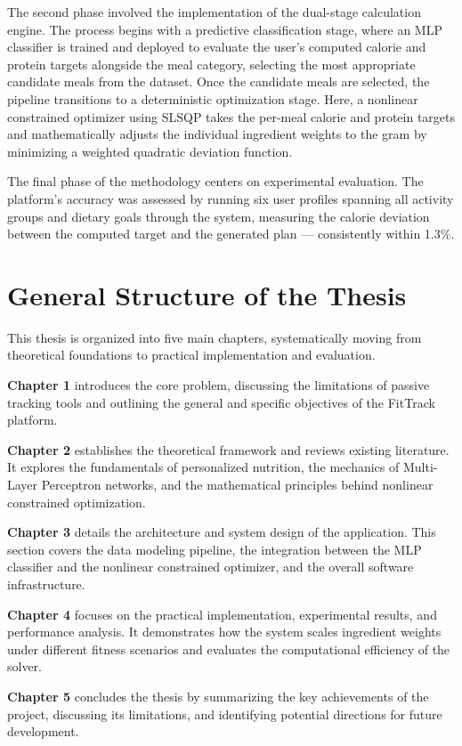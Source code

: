 The second phase involved the implementation of the dual-stage
calculation engine. The process begins with a predictive classification
stage, where an MLP classifier is trained and deployed to evaluate the
user's computed calorie and protein targets alongside the meal category,
selecting the most appropriate candidate meals from the dataset. Once
the candidate meals are selected, the pipeline transitions to a
deterministic optimization stage. Here, a nonlinear constrained
optimizer using SLSQP takes the per-meal calorie and protein targets
and mathematically adjusts the individual ingredient weights to the
gram by minimizing a weighted quadratic deviation function.

The final phase of the methodology centers on experimental evaluation.
The platform's accuracy was assessed by running six user profiles
spanning all activity groups and dietary goals through the system,
measuring the calorie deviation between the computed target and the
generated plan — consistently within 1.3\%.

\section{General Structure of the Thesis}

This thesis is organized into five main chapters, systematically moving 
from theoretical foundations to practical implementation and 
evaluation.

\textbf{Chapter 1} introduces the core problem, discussing the 
limitations of passive tracking tools and outlining the general and 
specific objectives of the FitTrack platform.

\textbf{Chapter 2} establishes the theoretical framework and reviews 
existing literature. It explores the fundamentals of personalized 
nutrition, the mechanics of Multi-Layer Perceptron networks, and the
mathematical principles behind nonlinear constrained optimization.

\textbf{Chapter 3} details the architecture and system design of the 
application. This section covers the data modeling pipeline, 
the integration between the MLP classifier and the nonlinear constrained
optimizer, and the overall software infrastructure.

\textbf{Chapter 4} focuses on the practical implementation, experimental 
results, and performance analysis. It demonstrates how the system 
scales ingredient weights under different fitness scenarios and 
evaluates the computational efficiency of the solver.

\textbf{Chapter 5} concludes the thesis by summarizing the key 
achievements of the project, discussing its limitations, and identifying 
potential directions for future development.